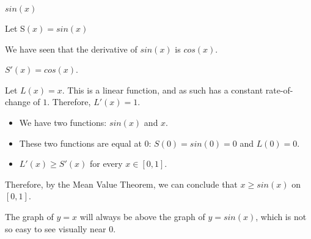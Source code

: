\documentclass{ximera}
\begin{document}
\begin{example} $sin(x)$


Let S$(x) = sin(x)$

We have seen that the derivative of $sin(x)$ is $cos(x)$.

$S'(x) = cos(x)$.

Let $L(x) = x$.  This is a linear function, and as such has a constant rate-of-change of $1$.  Therefore, $L'(x) = 1$. 


\begin{itemize}
\item We have two functions: $sin(x)$ and $x$. 
\item These two functions are equal at $0$: $S(0) = sin(0) = 0$ and $L(0) = 0$.
\item $L'(x) \geq S'(x)$ for every $x \in [0,1]$.
\end{itemize}




Therefore, by the Mean Value Theorem, we can conclude that $x \geq sin(x)$ on $[0,1]$.

The graph of $y = x$ will always be above the graph of $y = sin(x)$, which is not so easy to see visually near $0$.





\begin{center}
\end{center}







\end{example}
\end{document}
